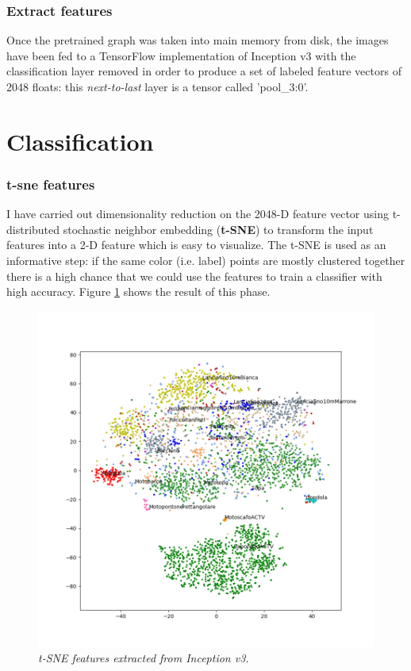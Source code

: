 \documentclass[12pt]{article}
\begin{document}
\subsubsection{Extract features}
Once the pretrained graph was taken into main memory from disk, the images have been fed to a TensorFlow implementation of Inception v3 with the classification layer removed in order to produce a set of labeled feature vectors of 2048 floats: this \textit{next-to-last} layer is a tensor called 'pool\_3:0'. 

\section{Classification}
\subsubsection{t-sne features}
I have carried out dimensionality reduction on the 2048-D feature vector using t-distributed stochastic neighbor embedding (\textbf{t-SNE}) to transform the input features into a 2-D feature which is easy to visualize. The t-SNE is used as an informative step: if the same color (i.e. label) points are mostly clustered together there is a high chance that we could use the features to train a classifier with high accuracy. Figure \ref{fig:tsne} shows the result of this phase.

\begin{figure}[!ht]
	\centering %
	\includegraphics[width=1\textwidth]{../code/output/features.png} %
	\caption{\textit{t-SNE features extracted from Inception v3.}} %
	\label{fig:tsne}
\end{figure}
\end{document}
